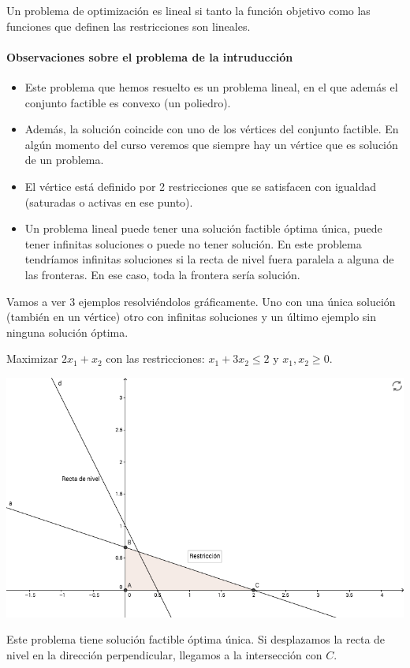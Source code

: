 \documentclass[palatino,nochap]{apuntes}
\begin{document}
\begin{defn}
Un problema de optimización es lineal si tanto la función objetivo como las funciones que definen las restricciones son lineales.
\end{defn}


\paragraph{Observaciones sobre el problema de la intruducción}
\begin{itemize}
	\item Este problema que hemos resuelto es un problema lineal, en el que además el conjunto factible es convexo (un poliedro).
	\item Además, la solución coincide con uno de los vértices del conjunto factible.
	\subitem En algún momento del curso veremos que siempre hay un vértice que es solución de un problema.
	\item El vértice está definido por 2 restricciones que se satisfacen con igualdad (saturadas o activas en ese punto).
	\item Un problema lineal puede tener una solución factible óptima única, puede tener infinitas soluciones o puede no tener solución.
	\subitem En este problema tendríamos infinitas soluciones si la recta de nivel fuera paralela a alguna de las fronteras. En ese caso, toda la frontera sería solución.
	\subitem 
\end{itemize}

Vamos a ver 3 ejemplos resolviéndolos gráficamente. Uno con una única solución (también en un vértice) otro con infinitas soluciones y un último ejemplo sin ninguna solución óptima.

\begin{example}
Maximizar $2x_1 + x_2$ con las restricciones: $x_1 + 3x_2 \leq 2$ y $x_1,x_2 \geq 0$.

\begin{center}
\includegraphics[scale=0.45]{img/io-intro_1.png}
\end{center}

Este problema tiene solución factible óptima única. Si desplazamos la recta de nivel en la dirección perpendicular, llegamos a la intersección con $C$.
\end{example}
\end{document}
